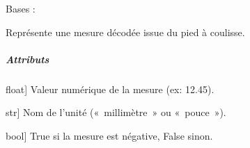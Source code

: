 \documentclass[letterpaper,10pt,french]{sphinxmanual}
\begin{document}
\begin{fulllineitems}
\label{\detokenize{api/hardware.devices:hardware.devices.caliper.CaliperData}}
\pysigstartsignatures
\pysiglinewithargsret
{}
{\sphinxparamcomma {}\sphinxparamcomma {}}
{}
\pysigstopsignatures
\sphinxAtStartPar
Bases : 

\sphinxAtStartPar
Représente une mesure décodée issue du pied à coulisse.


\subparagraph{Attributs}
\label{\detokenize{api/hardware.devices:attributs}}\begin{description}
\sphinxlineitem{value}{[}float{]}
\sphinxAtStartPar
Valeur numérique de la mesure (ex: 12.45).

\sphinxlineitem{unit\_name}{[}str{]}
\sphinxAtStartPar
Nom de l’unité (« millimètre » ou « pouce »).

\sphinxlineitem{is\_negative}{[}bool{]}
\sphinxAtStartPar
True si la mesure est négative, False sinon.

\end{description}

\begin{fulllineitems}
\label{\detokenize{api/hardware.devices:hardware.devices.caliper.CaliperData.value}}
\pysigstartsignatures
\pysigline
{}
\pysigstopsignatures
\end{fulllineitems}


\begin{fulllineitems}
\label{\detokenize{api/hardware.devices:hardware.devices.caliper.CaliperData.unit_name}}
\pysigstartsignatures
\pysigline
{}
\pysigstopsignatures
\end{fulllineitems}


\end{fulllineitems}
\end{document}
